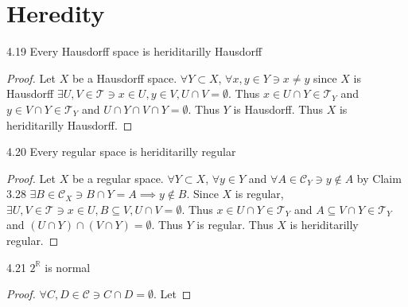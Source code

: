 \documentclass{article}
\newcommand*{\T}{\mathcal{T}}
\newcommand{\R}{\mathbb{R}}
\begin{document}
\pagebreak

\section{Heredity}
\begin{claim}{4.19}\label{claim 4.19.}
    Every Hausdorff space is heriditarilly Hausdorff
\end{claim}
\begin{proof}
    Let $X$ be a Hausdorff space. $\forall Y \subset X$, $\forall x, y \in Y \ni x \neq y$ since $X$ is Hausdorff $\exists U, V \in \T \ni x \in U, y \in V, U \cap V = \emptyset$. Thus $x \in U \cap Y \in \T_Y$ and $y \in V \cap Y \in \T_Y$ and $U \cap Y \cap V \cap Y = \emptyset$. Thus $Y$ is Hausdorff. Thus $X$ is heriditarilly Hausdorff.             
\end{proof}

\bigskip

\begin{claim}{4.20}\label{claim 4.20.}
    Every regular space is heriditarilly regular
\end{claim}
\begin{proof}
    Let $X$ be a regular space. $\forall Y \subset X$, $\forall y \in Y$ and $\forall A \in \mathcal{C}_Y \ni y \not \in A$ by Claim 3.28 $\exists B \in \mathcal{C}_X \ni B \cap Y = A \implies y \not \in B$. Since $X$ is regular, $\exists U, V \in \T \ni x \in U, B \subseteq V, U \cap V = \emptyset$. Thus $x \in U \cap Y \in \T_Y$ and $A \subseteq V \cap Y \in \T_Y$ and $(U \cap Y) \cap (V \cap Y) = \emptyset$. Thus $Y$ is regular. Thus $X$ is heriditarilly regular.             
\end{proof}

\bigskip

\begin{claim}{4.21}\label{Claim 4.21.}
    $2^\R$ is normal
\end{claim}
\begin{proof}
    $\forall C, D \in \mathcal{C} \ni C \cap D = \emptyset$. Let 
    
        
    
    
    
\end{proof}
\end{document}
